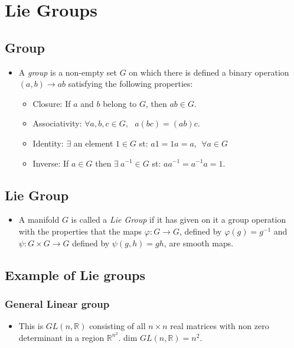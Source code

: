 \documentclass[11pt]{article}
\numberwithin{equation}{section}
\DeclareRobustCommand{\RR}{\mathbb{R}}
\begin{document}
 \section{Lie Groups}
 \subsection{Group}
 \begin{itemize}
   \item A \emph{group} is a non-empty set $G$ on which there is defined a binary operation $(a,b) \rightarrow ab$ satisfying the following properties:
   \begin{itemize}
     \item Closure: If $a$ and $b$ belong to $G$, then $ab \in G$.
     \item Associativity: $\forall a,b,c \in G,~~~a(bc) = (ab)c$.
     \item Identity: $\exists$ an element $1\in G$ st: $a1=1a =a,~~\forall a \in G$
     \item Inverse: If $a\in G$ then $\exists~a^{-1}\in G $ st: $aa^{-1} = a^{-1}a = 1$. 
   \end{itemize}
    \end{itemize}

    \subsection{Lie Group}
    \begin{itemize}
      \item A manifold $G$ is called a \emph{Lie Group} if it has given on it a group operation with the properties that the maps $\varphi:G \rightarrow G$, defined by $\varphi(g) = g^{-1}$ and $\psi:G \times G \rightarrow G$ defined by $\psi(g,h) = gh$, are smooth maps. 
    \end{itemize}

    \subsection{Example of Lie groups}
    \subsubsection{General Linear group}
    \begin{itemize}
      \item This is $GL(n,\RR)$ consisting of all $n \times n$ real matrices with non zero determinant in a region $\RR^{n^2}$. dim $GL(n,\RR) = n^2$.
    \end{itemize}
\end{document}

